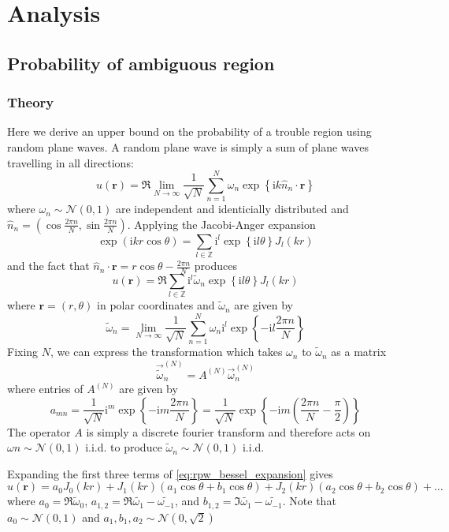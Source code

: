\documentclass{report}
\newcommand{\rr}[0]{\mathbf{r}}
\begin{document}
\section{Analysis}

\subsection{Probability of ambiguous region}

\subsubsection{Theory}
Here we derive an upper bound on the probability of a trouble region using random plane waves. A random plane wave is simply a sum of plane waves travelling in all directions:
\[
u(\rr) = \Re \lim_{N \rightarrow \infty} \frac{1}{\sqrt{N}} \sum_{n=1}^{N} \omega_{n} \exp{\left\{\mathrm{i} k \hat{n}_{n} \cdot \rr \right\}}
\]
where $\omega_{n} \sim \mathcal{N}(0,1)$ are independent and identicially distributed and $\hat{n}_{n} = (\cos \frac {2 \pi n}{N}, \sin \frac {2 \pi n}{N})$. Applying the Jacobi-Anger expansion
\[
\exp(\mathrm{i} k r \cos \theta) = \sum_{l \in \mathbb{Z}} \mathrm{i}^{l} \exp{\left\{\mathrm{i} l \theta \right\}} J_{l}(kr)
\]
and the fact that $\hat{n}_{n} \cdot \rr = r \cos{\theta - \frac{2 \pi n}{N}}$ produces
\begin{equation}
  \label{eq:rpw_bessel_expansion}
  u(\rr) = \Re \sum_{l \in \mathbb{Z}} \mathrm{i}^{l} \tilde{\omega}_{n} \exp{\left\{\mathrm{i} l \theta \right\}} J_{l}(kr)
\end{equation}
where $\rr = (r, \theta)$ in polar coordinates and $\tilde{\omega}_{n}$ are given by
\[
\tilde{\omega}_{n} = \lim_{N \rightarrow \infty} \frac{1}{\sqrt{N}} \sum_{n=1}^{N} \omega_{n} \mathrm{i}^{l} \exp{\left\{-\mathrm{i} l \frac{2 \pi n}{N} \right\}}
\]
Fixing $N$, we can express the transformation which takes $\omega_n$ to $\tilde{\omega}_n$ as a matrix
\[
\overrightarrow{\tilde{\omega}}_{n}^{(N)} = A^{(N)} \overrightarrow{\omega}_{n}^{(N)}
\]
where entries of $A^{(N)}$ are given by
\[
a_{mn} = \frac{1}{\sqrt{N}} \mathrm{i}^{m} \exp{\left\{-\mathrm{i} m \frac{2 \pi n}{N} \right\}} = \frac{1}{\sqrt{N}} \exp{\left\{-\mathrm{i} m \left(\frac{2 \pi n}{N} - \frac{\pi}{2}\right) \right\}} 
\]
The operator $A$ is simply a discrete fourier transform and therefore acts on $\omega{n} \sim \mathcal{N}(0,1)$ i.i.d. to produce $\tilde{\omega}_{n} \sim \mathcal{N}(0, 1)$ i.i.d.

Expanding the first three terms of \ref{eq:rpw_bessel_expansion} gives
\[
u(\rr) = a_{0} J_{0}(kr) + J_{1}(kr) (a_{1} \cos{\theta} + b_{1} \cos{\theta}) + J_{2}(kr) (a_{2} \cos{\theta} + b_{2} \cos{\theta}) + \ldots
\]
where $a_{0} = \Re \tilde{\omega}_{0}$, $a_{1,2} = \Re \tilde{\omega_{1}} - \tilde{\omega_{-1}}$, and $b_{1,2} = \Im \tilde{\omega_{1}} - \tilde{\omega_{-1}}$. Note that $a_{0} \sim \mathcal{N}(0,1)$ and $a_{1}, b_{1}, a_{2} \sim \mathcal{N}(0,\sqrt{2})$
\end{document}
